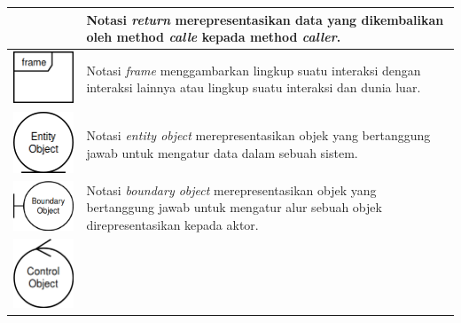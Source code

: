 \begin{longtable}{|>{\centering}m{5cm}|m{7cm}|}
                         & Notasi \emph{return} merepresentasikan data
                           yang dikembalikan oleh method \emph{calle}
                           kepada method \emph{caller}.\\\hline
  \includegraphics[width=.4\linewidth]{img/uml-notation/frame}
                         & Notasi \emph{frame} menggambarkan lingkup
                           suatu interaksi dengan interaksi lainnya
                           atau lingkup suatu interaksi dan dunia luar. \\\hline
  \includegraphics[width=.3\linewidth]{img/uml-notation/entity}
                         & Notasi \emph{entity object} merepresentasikan
                           objek yang bertanggung jawab untuk mengatur
                           data dalam sebuah sistem. \\\hline
  \includegraphics[width=.3\linewidth]{img/uml-notation/boundary}
                         & Notasi \emph{boundary object} merepresentasikan
                           objek yang bertanggung jawab untuk mengatur
                           alur sebuah objek direpresentasikan kepada aktor. \\\hline
  \includegraphics[width=.3\linewidth]{img/uml-notation/control}

\end{longtable}
